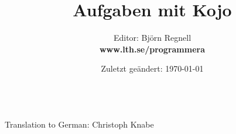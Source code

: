 \documentclass[12pt]{book}
\title{\fontsize{36}{36}\bf\sffamily\selectfont Aufgaben mit Kojo }
\author{Editor: Björn Regnell \\ \bf www.lth.se/programmera}
\date{Zuletzt geändert: \today{ }}
\begin{document}
\maketitle
\newpage
\thispagestyle{empty}

 \\
Translation to German: Christoph Knabe
\newpage
\begin{multicols}{4}
\tableofcontents
\mainmatter
\end{multicols}

\fontsize{20}{22}\selectfont\raggedright


\end{document}
